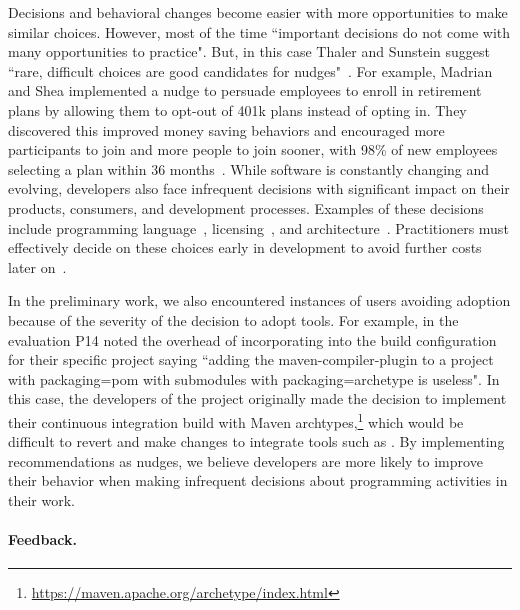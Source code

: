 Decisions and behavioral changes become easier with more opportunities to make similar choices. However, most of the time ``important decisions do not come with many opportunities to practice". But, in this case Thaler and Sunstein suggest ``rare, difficult choices are good candidates for nudges"~\cite[p.~76-77]{sunstein2008nudge}. For example, Madrian and Shea implemented a nudge to persuade employees to enroll in retirement plans by allowing them to opt-out of 401k plans instead of opting in. They discovered this improved money saving behaviors and encouraged more participants to join and more people to join sooner, with 98\% of new employees selecting a plan within 36 months~\cite{madrian2001power}. While software is constantly changing and evolving, developers also face infrequent decisions with significant impact on their products, consumers, and development processes. Examples of these decisions include programming language~\cite{spinellis2006choosing}, licensing~\cite{colazo2009impact}, and architecture~\cite{jansen2005software}. Practitioners must effectively decide on these choices early in development to avoid further costs later on~\cite{SEEconomics}.

In the preliminary work, we also encountered instances of users avoiding adoption because of the severity of the decision to adopt tools. For example, in the \sorry evaluation P14 noted the overhead of incorporating \EP into the build configuration for their specific project saying ``adding the maven-compiler-plugin to a project with packaging=pom with submodules with packaging=archetype is useless". In this case, the developers of the project originally made the decision to implement their continuous integration build with Maven archtypes,\footnote{\url{https://maven.apache.org/archetype/index.html}} which would be difficult to revert and make changes to integrate tools such as \EP. By implementing recommendations as nudges, we believe developers are more likely to improve their behavior when making infrequent decisions about programming activities in their work.

\paragraph{Feedback.} 

